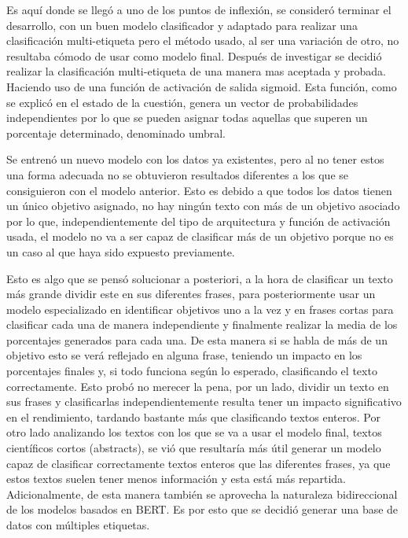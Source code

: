 Es aquí donde se llegó a uno de los puntos de inflexión, se consideró terminar
el desarrollo, con un buen modelo clasificador y adaptado para realizar una
clasificación multi-etiqueta pero el método usado, al ser una variación  de
otro, no resultaba cómodo de usar como modelo final. Después de investigar se
decidió realizar la clasificación multi-etiqueta de una manera mas aceptada y
probada. Haciendo uso de una función de activación de salida sigmoid. Esta
función, como se explicó en el estado de la cuestión, genera un vector de
probabilidades independientes por lo que se pueden asignar todas aquellas que
superen un porcentaje determinado, denominado umbral. 

Se entrenó un nuevo modelo con los datos ya existentes, pero al no tener estos
una forma adecuada no se obtuvieron resultados diferentes a los que se consiguieron  con el
modelo anterior. Esto es debido a que todos los datos tienen un único objetivo
asignado, no hay ningún texto con más de un objetivo asociado por lo que,
independientemente del tipo de arquitectura y función de activación usada, el
modelo no va a ser capaz de clasificar más de un objetivo porque no es un caso
al que haya sido expuesto previamente.

Esto es algo que se pensó solucionar a posteriori, a la hora de clasificar un
texto más grande dividir este en sus diferentes frases, para posteriormente usar
un modelo especializado en identificar objetivos uno a la vez y en frases cortas
para clasificar cada una de manera independiente y finalmente realizar la media
de los porcentajes generados para cada una. De esta manera si se habla de más de
un objetivo esto se verá reflejado en alguna frase, teniendo un impacto en los
porcentajes finales y, si todo funciona según lo esperado, clasificando el texto
correctamente. Esto probó no merecer la pena, por un lado, dividir un texto en
sus frases y clasificarlas independientemente resulta tener un impacto
significativo en el rendimiento, tardando bastante más que clasificando textos
enteros. Por otro lado analizando los textos con los que se va a usar el modelo
final, textos científicos cortos (abstracts), se vió que resultaría más útil
generar un modelo capaz de clasificar correctamente textos enteros que las
diferentes frases, ya que estos textos suelen tener menos información y esta
está más repartida. Adicionalmente, de esta manera también se aprovecha la
naturaleza bidireccional de los modelos basados en BERT. Es por esto que se
decidió generar una base de datos con múltiples etiquetas.

